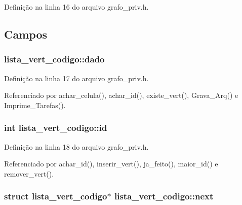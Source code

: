 Definição na linha 16 do arquivo grafo\+\_\+priv.\+h.



\subsection{Campos}
\hypertarget{structlista__vert__codigo_a8e51b3141307b34cb74d6433a136f73b}{}
\subsubsection[{dado}]{ lista\+\_\+vert\+\_\+codigo\+::dado}\label{structlista__vert__codigo_a8e51b3141307b34cb74d6433a136f73b}


Definição na linha 17 do arquivo grafo\+\_\+priv.\+h.



Referenciado por achar\+\_\+celula(), achar\+\_\+id(), existe\+\_\+vert(), Grava\+\_\+\+Arq() e Imprime\+\_\+\+Tarefas().

\hypertarget{structlista__vert__codigo_acc7c3bce66ab242ba6e64e763dfb63b3}{}
\subsubsection[{id}]{\setlength{\rightskip}{0pt plus 5cm}int lista\+\_\+vert\+\_\+codigo\+::id}\label{structlista__vert__codigo_acc7c3bce66ab242ba6e64e763dfb63b3}


Definição na linha 18 do arquivo grafo\+\_\+priv.\+h.



Referenciado por achar\+\_\+id(), inserir\+\_\+vert(), ja\+\_\+feito(), maior\+\_\+id() e remover\+\_\+vert().

\hypertarget{structlista__vert__codigo_af1cac7f22cb6142a13bd1f9c41f4c0b5}{}
\subsubsection[{next}]{\setlength{\rightskip}{0pt plus 5cm}struct {\bf lista\+\_\+vert\+\_\+codigo}$\ast$ lista\+\_\+vert\+\_\+codigo\+::next}\label{structlista__vert__codigo_af1cac7f22cb6142a13bd1f9c41f4c0b5}


